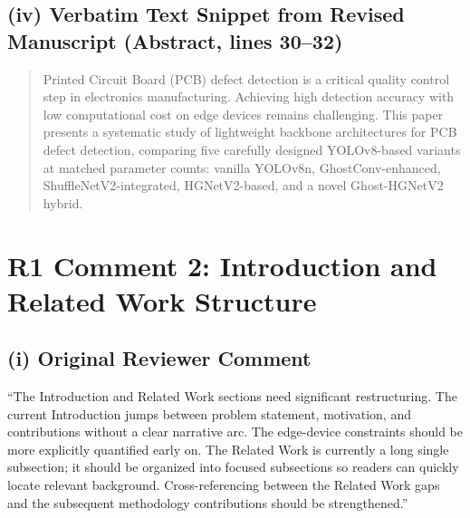 \documentclass[conference]{IEEEtran}
\begin{document}
\subsection*{(iv) Verbatim Text Snippet from Revised Manuscript (Abstract, lines 30--32)}
\begin{quote}
Printed Circuit Board (PCB) defect detection is a critical quality control step in electronics manufacturing. Achieving high detection accuracy with low computational cost on edge devices remains challenging. This paper presents a systematic study of lightweight backbone architectures for PCB defect detection, comparing five carefully designed YOLOv8-based variants at matched parameter counts: vanilla YOLOv8n, GhostConv-enhanced, ShuffleNetV2-integrated, HGNetV2-based, and a novel Ghost-HGNetV2 hybrid.
\end{quote}

\section*{R1 Comment 2: Introduction and Related Work Structure}

\subsection*{(i) Original Reviewer Comment}
``The Introduction and Related Work sections need significant restructuring. The current Introduction jumps between problem statement, motivation, and contributions without a clear narrative arc. The edge-device constraints should be more explicitly quantified early on. The Related Work is currently a long single subsection; it should be organized into focused subsections so readers can quickly locate relevant background. Cross-referencing between the Related Work gaps and the subsequent methodology contributions should be strengthened.''
\end{document}
